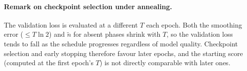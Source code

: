 \documentclass[11pt]{article}
\begin{document}
\paragraph{Remark on checkpoint selection under annealing.}
The validation loss is evaluated at a different $T$ each epoch. Both the smoothing error
($\le T\ln 2$) and $\tilde n$ for absent phases shrink with $T$, so the validation loss
tends to fall as the schedule progresses regardless of model quality. Checkpoint
selection and early stopping therefore favour later epochs, and the starting score
(computed at the first epoch's $T$) is not directly comparable with later ones.
\end{document}
